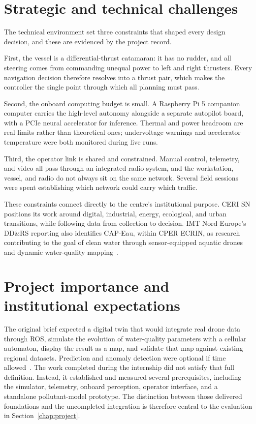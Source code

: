 \documentclass[a4paper,12pt,oneside,openany]{report}
\begin{document}
\section{Strategic and technical challenges}

The technical environment set three constraints that shaped every design decision, and these are
evidenced by the project record.

First, the vessel is a differential-thrust catamaran: it has no rudder, and all steering comes from
commanding unequal power to left and right thrusters. Every navigation decision therefore resolves
into a thrust pair, which makes the controller the single point through which all planning must
pass.

Second, the onboard computing budget is small. A Raspberry Pi 5 companion computer carries the
high-level autonomy alongside a separate autopilot board, with a PCIe neural accelerator for
inference. Thermal and power headroom are real limits rather than theoretical ones; undervoltage
warnings and accelerator temperature were both monitored during live runs.

Third, the operator link is shared and constrained. Manual control, telemetry, and video all pass
through an integrated radio system, and the workstation, vessel, and radio do not always sit on the
same network. Several field sessions were spent establishing which network could carry which
traffic.

These constraints connect directly to the centre's institutional purpose. CERI SN positions its
work around digital, industrial, energy, ecological, and urban transitions, while following data
from collection to decision. IMT Nord Europe's DD\&RS reporting also identifies CAP-Eau, within CPER
ECRIN, as research contributing to the goal of clean water through sensor-equipped aquatic drones
and dynamic water-quality mapping~\cite{imtneCeriSn,imtne2024ddrsReport}.

\section{Project importance and institutional expectations}
The original brief expected a digital twin that would integrate real drone data through ROS,
simulate the evolution of water-quality parameters with a cellular automaton, display the result as
a map, and validate that map against existing regional datasets. Prediction and anomaly detection
were optional if time allowed~\cite{internshipBrief2026}. The work completed during the internship
did not satisfy that full definition. Instead, it established and measured several prerequisites,
including the simulator, telemetry, onboard perception, operator interface, and a standalone
pollutant-model prototype. The distinction between those delivered foundations and the uncompleted
integration is therefore central to the evaluation in Section~\ref{chap:project}.
\end{document}
